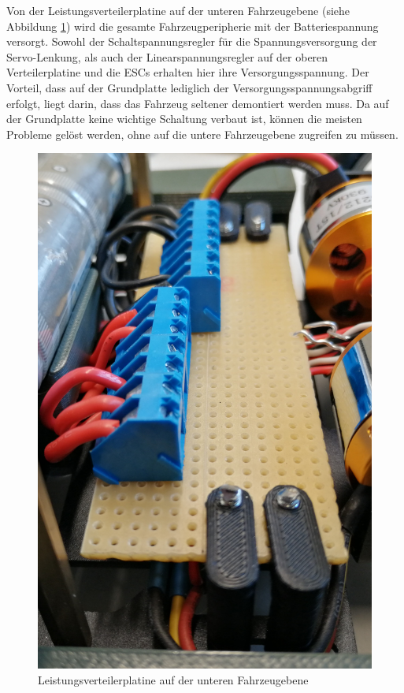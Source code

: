 \begin{minipage}[t]{0.47\textwidth}
Von der Leistungsverteilerplatine auf der unteren Fahrzeugebene (siehe Abbildung \ref{fig:Leistungsverteilerplatine}) wird die gesamte Fahrzeugperipherie mit der Batteriespannung versorgt. Sowohl der Schaltspannungsregler für die Spannungsversorgung der Servo-Lenkung, als auch der Linearspannungsregler auf der oberen Verteilerplatine und die \acp{ESC} erhalten hier ihre Versorgungsspannung. Der Vorteil, dass auf der Grundplatte lediglich der Versorgungsspannungsabgriff erfolgt, liegt darin, dass das Fahrzeug seltener demontiert werden muss. Da auf der Grundplatte keine wichtige Schaltung verbaut ist, können die meisten Probleme gelöst werden, ohne auf die untere Fahrzeugebene zugreifen zu müssen.
\end{minipage}
\begin{minipage}[t]{0.47\textwidth}
\vspace{-7mm}
\begin{figure}[H] %
\includegraphics[width=.7\textwidth]{sec8/images/Leistungsverteilerplatine} 
\centering
\captionsetup{width=.9\textwidth}
\caption[Leistungsverteilerplatine auf der unteren Fahrzeugebene]{Leistungsverteilerplatine auf der unteren Fahrzeugebene}
\centering
\label{fig:Leistungsverteilerplatine}
\end{figure}
\end{minipage}


